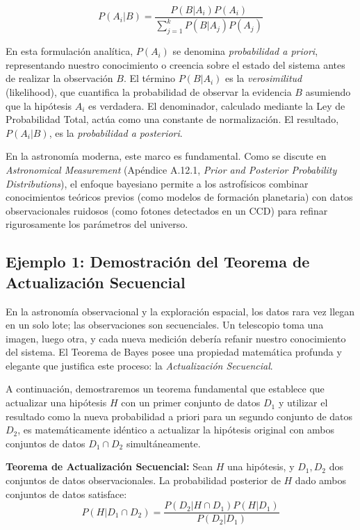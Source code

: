 $$ P(A_i | B) = \frac{P(B | A_i) P(A_i)}{\sum_{j=1}^k P(B | A_j) P(A_j)} $$

En esta formulación analítica, $P(A_i)$ se denomina \textit{probabilidad a priori}, representando nuestro conocimiento o creencia sobre el estado del sistema antes de realizar la observación $B$. El término $P(B | A_i)$ es la \textit{verosimilitud} (likelihood), que cuantifica la probabilidad de observar la evidencia $B$ asumiendo que la hipótesis $A_i$ es verdadera. El denominador, calculado mediante la Ley de Probabilidad Total, actúa como una constante de normalización. El resultado, $P(A_i | B)$, es la \textit{probabilidad a posteriori}. 

En la astronomía moderna, este marco es fundamental. Como se discute en \textit{Astronomical Measurement} (Apéndice A.12.1, \textit{Prior and Posterior Probability Distributions}), el enfoque bayesiano permite a los astrofísicos combinar conocimientos teóricos previos (como modelos de formación planetaria) con datos observacionales ruidosos (como fotones detectados en un CCD) para refinar rigurosamente los parámetros del universo.

\subsection{Ejemplo 1: Demostración del Teorema de Actualización Secuencial}

En la astronomía observacional y la exploración espacial, los datos rara vez llegan en un solo lote; las observaciones son secuenciales. Un telescopio toma una imagen, luego otra, y cada nueva medición debería refanir nuestro conocimiento del sistema. El Teorema de Bayes posee una propiedad matemática profunda y elegante que justifica este proceso: la \textit{Actualización Secuencial}. 

A continuación, demostraremos un teorema fundamental que establece que actualizar una hipótesis $H$ con un primer conjunto de datos $D_1$ y utilizar el resultado como la nueva probabilidad a priori para un segundo conjunto de datos $D_2$, es matemáticamente idéntico a actualizar la hipótesis original con ambos conjuntos de datos $D_1 \cap D_2$ simultáneamente.

\textbf{Teorema de Actualización Secuencial:}
Sean $H$ una hipótesis, y $D_1, D_2$ dos conjuntos de datos observacionales. La probabilidad posterior de $H$ dado ambos conjuntos de datos satisface:
$$ P(H | D_1 \cap D_2) = \frac{P(D_2 | H \cap D_1) P(H | D_1)}{P(D_2 | D_1)} $$

